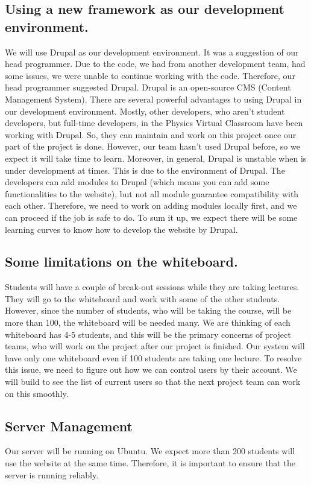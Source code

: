\documentclass[10pt]{article}
\begin{document}
    \subsection{Using a new framework as our development environment.}
        We will use Drupal as our development environment. It was a suggestion of our head programmer. Due to the code, we had from another development team, had some issues, we were unable to continue working with the code. Therefore, our head programmer suggested Drupal. Drupal is an open-source CMS (Content Management System). There are several powerful advantages to using Drupal in our development environment. Mostly, other developers, who aren’t student developers, but full-time developers, in the Physics Virtual Classroom have been working with Drupal. So, they can maintain and work on this project once our part of the project is done. However, our team hasn’t used Drupal before, so we expect it will take time to learn. Moreover, in general, Drupal is unstable when is under development at times. This is due to the environment of Drupal. The developers can add modules to Drupal (which means you can add some functionalities to the website), but not all module guarantee compatibility with each other. Therefore, we need to work on adding modules locally first, and we can proceed if the job is safe to do. To sum it up, we expect there will be some learning curves to know how to develop the website by Drupal.

    \subsection{Some limitations on the whiteboard.}
        Students will have a couple of break-out sessions while they are taking lectures. They will go to the whiteboard and work with some of the other students. However, since the number of students, who will be taking the course, will be more than 100, the whiteboard will be needed many. We are thinking of each whiteboard has 4-5 students, and this will be the primary concerns of project teams, who will work on the project after our project is finished. Our system will have only one whiteboard even if 100 students are taking one lecture. To resolve this issue, we need to figure out how we can control users by their account. We will build to see the list of current users so that the next project team can work on this smoothly.

    \subsection{Server Management}
        Our server will be running on Ubuntu. We expect more than 200 students will use the website at the same time. Therefore, it is important to ensure that the server is running reliably.
\end{document}
